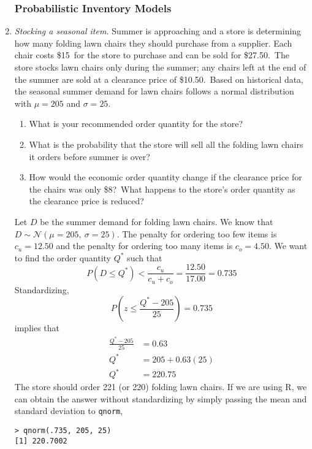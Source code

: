 \begin{enumerate}
\subsubsection*{Probabilistic Inventory Models}

\item \emph{Stocking a seasonal item.} Summer is approaching and a
  store is determining how many folding lawn chairs they should
  purchase from a supplier.  Each chair costs \$15\ for the store to
  purchase and can be sold for \$27.50.\ The store stocks lawn chairs
  only during the summer; any chairs left at the end of the summer are
  sold at a clearance price of \$10.50.\ Based on historical data, the
  seasonal summer demand for lawn chairs follows a normal distribution with
  $\mu = 205$ and $\sigma = 25$.

\begin{enumerate}
\item What is your recommended order quantity for the store?
\item What is the probability that the store will sell all the folding
  lawn chairs it orders before summer is over? \label{ex:lawn}
\item How would the economic order quantity change if the clearance
  price for the chairs was only \$8?\ What happens to the store's
  order quantity as the clearance price is reduced? \label{ex:clearance}
\end{enumerate}

\begin{solution}
  \bs Let $D$ be the summer demand for folding lawn chairs. We know
  that $D \sim \mathcal{N}\left(\mu=205,~\sigma=25\right)$. The
  penalty for ordering too few items is $c_u= 12.50$ and the penalty
  for ordering too many items is $c_o= 4.50$. We want to find the
  order quantity $Q^{\ast}$ such that
\[ P\left(D \leq Q^{\ast}\right) < \frac{c_u}{c_u+c_o} = \frac{12.50}{17.00} = 0.735 \]
Standardizing,
\[ P\left(z \leq \frac{Q^{\ast}-205}{25}\right) = 0.735 \]
implies that
\begin{align*}
\frac{Q^{\ast}-205}{25} &= 0.63 \\
Q^{\ast} &= 205 + 0.63(25)\\
Q^{\ast} &= 220.75
\end{align*}
The store should order 221 (or 220) folding lawn chairs. 
If we are using R, we can obtain the answer without standardizing
by simply passing the mean and standard deviation to \texttt{qnorm},
\begin{Verbatim}
> qnorm(.735, 205, 25)
[1] 220.7002
\end{Verbatim}


\end{solution}
\end{enumerate}
